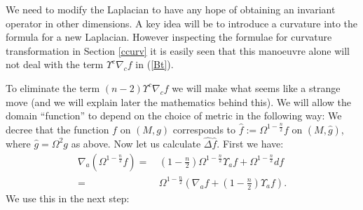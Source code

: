 \documentclass[a4paper,12pt]{amsart}
\theoremstyle{remark}
\newcommand{\nn}[1]{(\ref{#1})}
\begin{document}
We need to modify the Laplacian to have any hope of obtaining an
invariant operator in other dimensions.  A key idea will be to
introduce a curvature into the formula for a new Laplacian. However
inspecting the formulae for curvature transformation in Section
\ref{ccurv} it is easily seen that this manoeuvre alone will not deal
with the term $\Upsilon^c\nabla_c f$ in \nn{Bt}.

To eliminate the term $(n-2)\Upsilon^c\nabla_c f$ we will make what
seems like a strange move (and we will explain later the mathematics
behind this).  We will allow the domain ``function'' to depend on the choice
of metric in the following way: We decree that the function $f$ on
$(M,g)$ corresponds to $\widehat{f}:=\Omega^{1-\frac{n}{2}}f$ on
$(M,\widehat{g})$, where $\widehat{g}=\Omega^2 g$ as above. Now let us
calculate $\widehat{\Delta}\widehat{f} $. First we have:
\begin{equation}\nonumber
\begin{split}
 \nabla_a (\Omega^{1-\frac{n}{2}}f)=&
 \,\left(1-\frac{n}{2}\right)\Omega^{1-\frac{n}{2}}\Upsilon_a f+
 \Omega^{1-\frac{n}{2}} df\\
=&\,\Omega^{1-\frac{n}{2}}\left(\nabla_a f+\left(1-\frac{n}{2}\right)
\Upsilon_a f\right).
\end{split}
\end{equation}
We use this in the next step:
\end{document}
